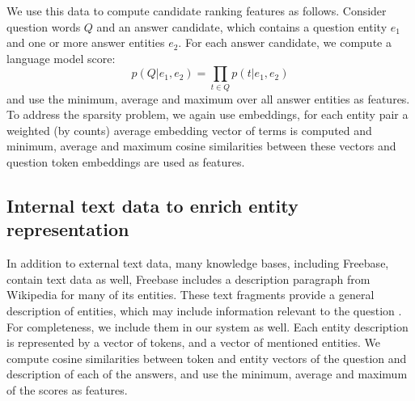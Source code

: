 We use this data to compute candidate ranking features as follows.
Consider question words $Q$ and an answer candidate, which contains a question entity $e_1$ and one or more answer entities $e_2$.
For each answer candidate, we compute a language model score:
$$p(Q|e_1, e_2) = \prod_{t\in Q} p(t | e_1, e_2)$$
and use the minimum, average and maximum over all answer entities as features.
To address the sparsity problem, we again use embeddings, 
\ie for each entity pair a weighted (by counts) average embedding vector of terms is computed and minimum, average and maximum cosine similarities between these vectors and question token embeddings are used as features.

\subsection{Internal text data to enrich entity representation}
In addition to external text data, many knowledge bases, including Freebase, contain text data as well, \eg Freebase includes a description paragraph from Wikipedia for many of its entities.
These text fragments provide a general description of entities, which may include information relevant to the question \cite{Sun:2015:ODQ:2736277.2741651}.
For completeness, we include them in our system as well.
Each entity description is represented by a vector of tokens, and a vector of mentioned entities.
We compute cosine similarities between token and entity vectors of the question and description of each of the answers, and use the minimum, average and maximum of the scores as features.
